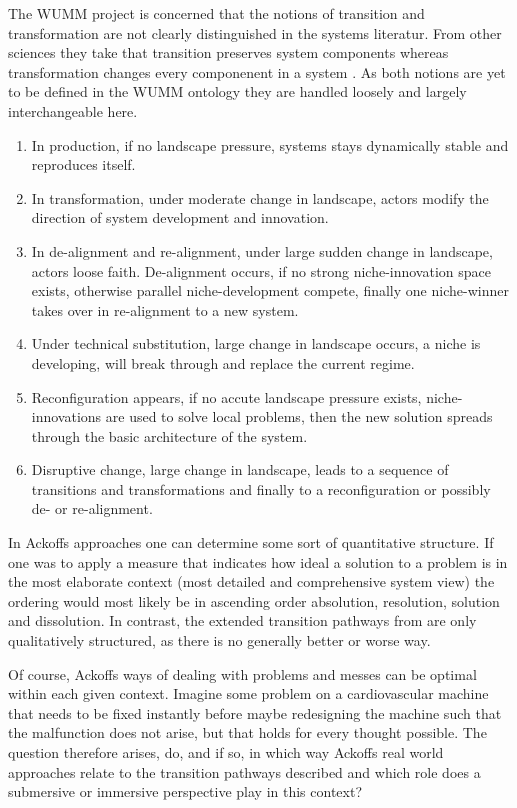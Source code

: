 \documentclass[a4paper,11pt]{article}
\begin{document}
The WUMM project is concerned that the notions of transition and
transformation are not clearly distinguished in the systems literatur. From
other sciences they take that transition preserves system components whereas
transformation changes every componenent in a system
\cite[p.~78]{grabe2020seminar}.  As both notions are yet to be defined in the
WUMM ontology they are handled loosely and largely interchangeable here.
\begin{enumerate}
\item In production, if no landscape pressure, systems stays dynamically
  stable and reproduces itself.
\item In transformation, under moderate change in landscape, actors modify
  the direction of system development and innovation.
\item In de-alignment and re-alignment, under large sudden change in
  landscape, actors loose faith. De-alignment occurs, if no strong
  niche-innovation space exists, otherwise parallel niche-development compete,
  finally one niche-winner takes over in re-alignment to a new system.
\item Under technical substitution, large change in landscape occurs, a niche
  is developing, will break through and replace the current regime.
\item Reconfiguration appears, if no accute landscape pressure exists,
  niche-innovations are used to solve local problems, then the new solution
  spreads through the basic architecture of the system.
\item Disruptive change, large change in landscape, leads to a sequence of
  transitions and transformations and finally to a reconfiguration or possibly
  de- or re-alignment.
\end{enumerate}

In Ackoffs approaches one can determine some sort of quantitative structure.
If one was to apply a measure that indicates how ideal a solution to a problem
is in the most elaborate context (most detailed and comprehensive system view)
the ordering would most likely be in ascending order absolution, resolution,
solution and dissolution. In contrast, the extended transition pathways from
\cite{geels2007typology} are only qualitatively structured, as there is no
generally better or worse way.

Of course, Ackoffs ways of dealing with problems and messes can be optimal
within each given context. Imagine some problem on a cardiovascular machine
that needs to be fixed instantly before maybe redesigning the machine such
that the malfunction does not arise, but that holds for every thought
possible.  The question therefore arises, do, and if so, in which way Ackoffs
real world approaches relate to the transition pathways described and which
role does a submersive or immersive perspective play in this context?
\end{document}
